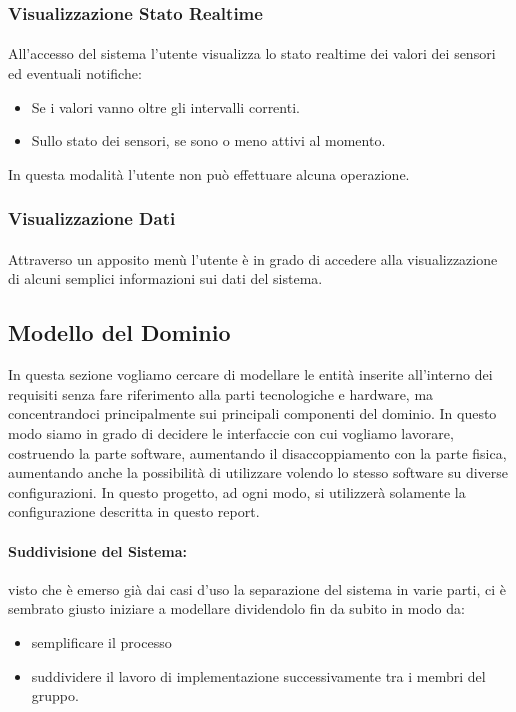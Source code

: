 \subsubsection{Visualizzazione Stato Realtime}

\paragraph{} All'accesso del sistema l'utente visualizza lo stato realtime dei valori dei sensori ed eventuali notifiche:
\begin{itemize}
  \item Se i valori vanno oltre gli intervalli correnti.
  \item Sullo stato dei sensori, se sono o meno attivi al momento.
\end{itemize}

In questa modalit\`a l'utente non pu\`o effettuare alcuna operazione.

\subsubsection{Visualizzazione Dati}

\paragraph{} Attraverso un apposito men\`u l'utente \`e in grado di accedere alla visualizzazione di alcuni semplici informazioni sui dati del sistema.

\newpage

\subsection{Modello del Dominio}

In questa sezione vogliamo cercare di modellare le entit\`a inserite all'interno dei requisiti senza fare riferimento alla parti tecnologiche e hardware, ma concentrandoci principalmente sui principali componenti del dominio. In questo modo siamo in grado di decidere le interfaccie con cui vogliamo lavorare, costruendo la parte software, aumentando il disaccoppiamento con la parte fisica, aumentando anche la possibilit\`a di utilizzare volendo lo stesso software su diverse configurazioni. In questo progetto, ad ogni modo, si utilizzer\`a solamente la configurazione descritta in questo report.

\paragraph{Suddivisione del Sistema:} visto che \`e emerso gi\`a dai casi d'uso la separazione del sistema in varie parti, ci \`e sembrato giusto iniziare a modellare dividendolo fin da subito in modo da:
\begin{itemize}
  \item semplificare il processo
  \item suddividere il lavoro di implementazione successivamente tra i membri del gruppo.
\end{itemize}

